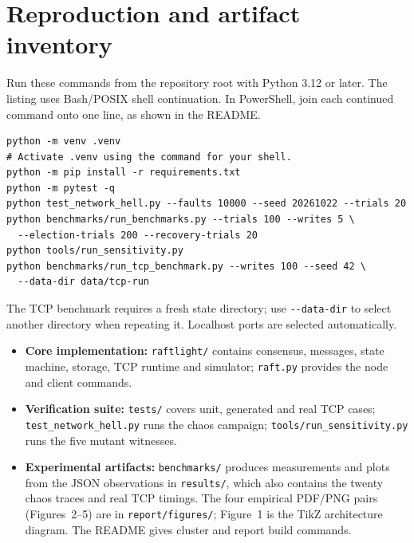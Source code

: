\documentclass[10pt,a4paper]{article}
\begin{document}
\clearpage
\appendix
\section{Reproduction and artifact inventory}
Run these commands from the repository root with Python 3.12 or later.
The listing uses Bash/POSIX shell continuation. In PowerShell, join each
continued command onto one line, as shown in the README.
{\small
\begin{verbatim}
python -m venv .venv
# Activate .venv using the command for your shell.
python -m pip install -r requirements.txt
python -m pytest -q
python test_network_hell.py --faults 10000 --seed 20261022 --trials 20
python benchmarks/run_benchmarks.py --trials 100 --writes 5 \
  --election-trials 200 --recovery-trials 20
python tools/run_sensitivity.py
python benchmarks/run_tcp_benchmark.py --writes 100 --seed 42 \
  --data-dir data/tcp-run
\end{verbatim}
}
The TCP benchmark requires a fresh state directory; use \texttt{-{}-data-dir} to
select another directory when repeating it. Localhost ports are selected
automatically.

\begin{itemize}
\item \textbf{Core implementation:} \texttt{raftlight/} contains consensus,
messages, state machine, storage, TCP runtime and simulator;
\texttt{raft.py} provides the node and client commands.
\item \textbf{Verification suite:} \texttt{tests/} covers unit, generated and
real TCP cases; \mbox{\texttt{test\_network\_hell.py}} runs the chaos campaign;
\mbox{\texttt{tools/run\_sensitivity.py}} runs the five mutant witnesses.
\item \textbf{Experimental artifacts:} \texttt{benchmarks/} produces measurements
and plots from the JSON observations in \texttt{results/}, which also contains
the twenty chaos traces and real TCP timings. The four empirical PDF/PNG pairs
(Figures~2--5) are in \texttt{report/figures/}; Figure~1 is the TikZ architecture
diagram. The README gives cluster and report build commands.
\end{itemize}
\end{document}

